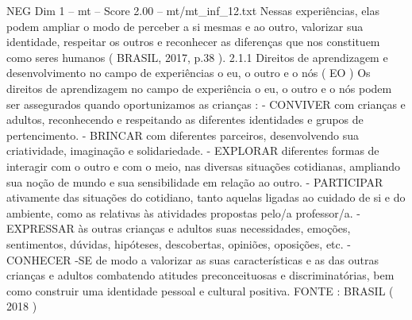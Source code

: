 \begin{textsample}{NEG Dim 1 – mt – Score 2.00 – mt/mt\_inf\_12.txt}
Nessas experiências, elas podem ampliar o modo de perceber a si mesmas e ao outro, valorizar sua identidade, respeitar os outros e reconhecer as diferenças que nos constituem como seres humanos ( BRASIL, 2017, p.38 ). 2.1.1 Direitos de aprendizagem e desenvolvimento no campo de experiências o eu, o outro e o nós ( EO ) Os direitos de aprendizagem no campo de experiência o eu, o outro e o nós podem ser assegurados quando oportunizamos as crianças : - CONVIVER com crianças e adultos, reconhecendo e respeitando as diferentes identidades e grupos de pertencimento. - BRINCAR com diferentes parceiros, desenvolvendo sua criatividade, imaginação e solidariedade. - EXPLORAR diferentes formas de interagir com o outro e com o meio, nas diversas situações cotidianas, ampliando sua noção de mundo e sua sensibilidade em relação ao outro. - PARTICIPAR ativamente das situações do cotidiano, tanto aquelas ligadas ao cuidado de si e do ambiente, como as relativas às atividades propostas pelo/a professor/a. - EXPRESSAR às outras crianças e adultos suas necessidades, emoções, sentimentos, dúvidas, hipóteses, descobertas, opiniões, oposições, etc. - CONHECER -SE de modo a valorizar as suas características e as das outras crianças e adultos combatendo atitudes preconceituosas e discriminatórias, bem como construir uma identidade pessoal e cultural positiva.
FONTE : BRASIL ( 2018 )

\end{textsample}
